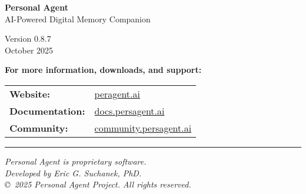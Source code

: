 \documentclass[11pt,letterpaper]{article}
\begin{document}
\begin{center}
{\Large\bfseries\color{primaryblue} Personal Agent}\\
\vspace{0.3cm}
{\large\color{secondarygreen} AI-Powered Digital Memory Companion}\\
\vspace{1cm}

Version 0.8.7 \\ October 2025\\
\vspace{1cm}

\textbf{For more information, downloads, and support:}\\
\vspace{0.5cm}
\begin{tabular}{ll}
\textbf{Website:} & \url{peragent.ai} \\
\textbf{Documentation:} & \url{docs.persagent.ai} \\
\textbf{Community:} & \url{community.persagent.ai} \\
\end{tabular}

\vspace{2cm}

\hrule
\vspace{0.5cm}

\textit{Personal Agent is proprietary software.}\\
\textit{Developed by Eric G. Suchanek, PhD.}\\
\vspace{0.3cm}
\textit{\copyright\ 2025 Personal Agent Project. All rights reserved.}

\end{center}
\end{document}
